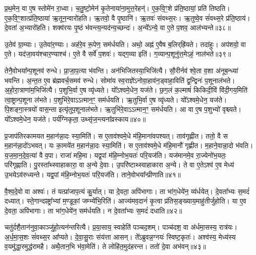 प्र॒थ॒मेन॒ वा ए॒ष स्तोमे॑न रा॒ध्वा।
च॒तु॒ष्टो॒मेन॑ कृ॒तेनाया॑ना॒मुत्त॒रे\-हन्॑।
ए॒क॒वि॒ꣳ॒शे प्र॑ति॒ष्ठायां॒ प्रति॑ तिष्ठति।
ए॒क॒वि॒ꣳ॒शात्प्र॑ति॒ष्ठाया॑ ऋ॒तून॒न्वारो॑हति।
ऋ॒तवो॒ वै पृ॒ष्ठानि॑।
ऋ॒तवः॑ संवथ्स॒रः।
ऋ॒तुष्वे॒व सं॑वथ्स॒रे प्र॑ति॒ष्ठाय॑।
दे॒वता॑ अ॒भ्यारो॑हति।
शक्व॑रयः पृ॒ष्ठं भ॑वन्त्य॒न्यद॑न्य॒च्छन्दः॑।
अ॒न्ये᳚\-ऽन्ये॒ वा ए॒ते प॒शव॒ आल॑भ्यन्ते॥३८॥\ip

उ॒तेव॑ ग्रा॒म्याः।
उ॒तेवा॑र॒ण्याः।
अह॑रे॒व रू॒पेण॒ सम॑र्धयति।
अथो॒ अह्न॑ ए॒वैष ब॒लिर्‌\mbox{}ह्रि॑यते।
तदा॑हुः।
अप॑शवो॒ वा ए॒ते।
यद॑जा॒वय॑श्चार॒ण्याश्च॑।
ए॒ते वै सर्वे॑ प॒शवः॑।
यद्ग॒व्या इति॑।
ग॒व्यान्प॒शूनु॑त्त॒मेऽहं॒ नाल॑भते॥३९॥\ip

तेनै॒वोभया᳚न्प॒शूनव॑ रुन्धे।
प्रा॒जा॒प॒त्या भ॑वन्ति।
अन॑भि\-जितस्या॒भि\-जि॑त्यै।
सौ॒रीर्नव॑ श्वे॒ता व॒शा अ॑नूब॒न्ध्या॑ भवन्ति।
अ॒न्त॒त ए॒व ब्र॑ह्म\-वर्च॒समव॑ रुन्धे।
सोमा॑य स्व॒राज्ञे॑\-ऽनोवा॒हाव॑न॒ड्वाहा॒विति॑ द्व॒न्द्विनः॑ प॒शूनाल॑भते।
अ॒हो॒रा॒त्राणा॑म॒भिजि॑त्यै।
प॒शुभि॒र्वा ए॒ष व्यृ॑ध्यते।
यो᳚ऽश्वमे॒धेन॒ यज॑ते।
छ॒ग॒लं क॒ल्माषं॑ किकिदी॒विं वि॑दी॒गय॒मिति॑ त्वा॒ष्ट्रान्प॒शूना ल॑भते।
प॒शुभि॑रे॒वाऽऽत्मान॒ꣳ॒ सम॑र्धयति।
ऋ॒तुभि॒र्वा ए॒ष व्यृ॑ध्यते।
यो᳚ऽश्वमे॒धेन॒ यज॑ते।
पि॒शङ्गा॒स्त्रयो॑ वास॒न्ता इत्यृ॑तुप॒शूनाल॑भते।
ऋ॒तुभि॑रे॒वाऽऽत्मान॒ꣳ॒ सम॑र्धयति।
आ वा ए॒ष प॒शुभ्यो॑ वृश्च्यते।
यो᳚ऽश्वमे॒धेन॒ यज॑ते।
पर्य॑ग्निकृता॒ उथ्सृ॑ज॒न्त्यना᳚व्रस्काय॥४०॥\ip\anuvakamend[ल॒भ्य॒न्ते॒ ल॒भ॒ते॒ त्वा॒ष्ट्रान्प॒शूनाल॑भते॒\-ऽष्टौ च॑]

प्र॒जा\-प॑तिरकामयत म॒हान॑न्ना॒दः स्या॒मिति॑।
स ए॒ताव॑श्वमे॒धे म॑हि॒माना॑वपश्यत्।
ताव॑गृह्णीत।
ततो॒ वै स म॒हान॑न्ना॒दो॑\-ऽभवत्।
यः का॒मये॑त म॒हान॑न्ना॒दः स्या॒मिति॑।
स ए॒ताव॑श्वमे॒धे म॑हि॒मानौ॑ गृह्णीत।
म॒हाने॒वान्ना॒दो भ॑वति।
य॒ज॒मा॒न॒दे॒व॒त्या॑ वै व॒पा।
राजा॑ महि॒मा।
यद्व॒पां म॑हि॒म्नोभ॒यतः॑ परि॒यज॑ति।
यज॑मानमे॒व रा॒ज्येनो॑भ॒यतः॒ परि॑गृह्णाति।
पु॒रस्ता᳚थ्स्वाहाकारा॒ वा अ॒न्ये दे॒वाः।
उ॒परि॑ष्टाथ्स्वाहाकारा अ॒न्ये।
ते वा ए॒ते\-ऽश्व॑ ए॒व मेध्य॑ उ॒भये\-ऽव॑रुध्यन्ते।
यद्व॒पां म॑हि॒म्नोभ॒यतः॑ परि॒यज॑ति।
ताने॒वोभया᳚न्प्रीणाति॥४१॥\ip\anuvakamend[प॒रि॒यज॑ति॒ षट्च॑]

वै॒श्व॒दे॒वो वा अश्वः॑।
तं यत्प्रा॑जाप॒त्यं कु॒र्यात्।
या दे॒वता॒ अपि॑भागाः।
ता भा॑ग॒धेये॑न॒ व्य॑र्धयेत्।
दे॒वता᳚भ्यः स॒मदं॑ दध्यात्।
स्ते॒गान्दꣴष्ट्रा᳚भ्यां म॒ण्डूकां॒ जम्भ्ये॑भि॒रिति॑।
आज्य॑मव॒दानं॑ कृ॒त्वा प्र॑तिस॒ङ्ख्याय॒माहु॑तीर्जुहोति।
या ए॒व दे॒वता॒ अपि॑भागाः।
ता भा॑ग॒धेये॑न॒ सम॑र्धयति।
न दे॒वता᳚भ्यः स॒मदं॑ दधाति॥४२॥\ip

चतु॑र्दशै॒तान॑नुवा॒काञ्जु॑हो॒त्यन॑न्तरित्यै।
प्र॒या॒साय॒ स्वाहेति॑ पञ्चद॒शम्।
पञ्च॑दश॒ वा अ॑र्धमा॒सस्य॒ रात्र॑यः।
अ॒र्ध॒मा॒स॒शः सं॑वथ्स॒र आ᳚प्यते।
दे॒वा॒सु॒राः संय॑त्ता आसन्।
ते᳚ऽब्रुवन्न॒ग्नयः॑ स्विष्ट॒कृतः॑।
अश्व॑स्य॒ मेध्य॑स्य व॒यमु॑द्धा॒रमुद्ध॑रामहै।
अथै॒तान॒भि भ॑वा॒मेति॑।
ते लोहि॑त॒मुद॑हरन्त।
ततो॑ दे॒वा अभ॑वन्॥४३॥\ip


